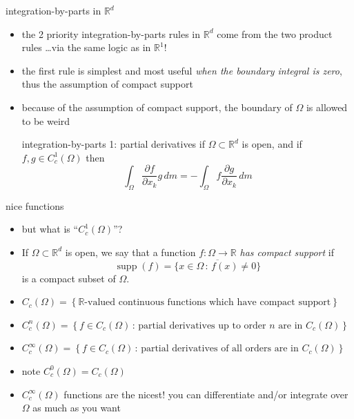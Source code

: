 \documentclass[10pt,
               svgnames,
               hyperref={colorlinks,
                         citecolor=DeepPink4,
                         linkcolor=FireBrick,
                         urlcolor=blue},
               usepdftitle=false]{beamer}
\newcommand{\RR}{\mathbb{R}}
\begin{document}
\begin{frame}{integration-by-parts in $\RR^d$}

\begin{itemize}
\item the \alert{2 priority integration-by-parts rules} in $\RR^d$ come from the two product rules \dots via the same logic as in $\RR^1$!
\item the first rule is simplest and most useful \emph{when the boundary integral is zero}, thus the assumption of compact support
\item because of the assumption of compact support, the boundary of $\Omega$ is allowed to be weird

\begin{block}{integration-by-parts 1: partial derivatives}
if $\Omega\subset\RR^d$ is open, and if $f,g\in C_c^1(\Omega)$ then
    $$\int_\Omega \frac{\partial f}{\partial x_k} g\,dm = -\int_\Omega f \frac{\partial g}{\partial x_k}\,dm$$
\end{block}
\end{itemize}
\end{frame}


\begin{frame}{nice functions}

\begin{itemize}
\item but what is ``$C_c^1(\Omega)$''?
\end{itemize}

\begin{definition}
\begin{itemize}
\item If $\Omega\subset\RR^d$ is open, we say that a function $f:\Omega\to\RR$ \emph{has compact support} if
	 $$\operatorname{supp}(f) = \overline{\{x\in\Omega\,:\,f(x)\ne 0\}}$$
is a compact subset of $\Omega$.
\item $C_c(\Omega) = \left\{\text{$\RR$-valued continuous functions which have compact support}\right\}$
\item $C_c^n(\Omega) = \left\{f\in C_c(\Omega)\,:\,\text{partial derivatives up to order $n$ are in } C_c(\Omega)\right\}$
\item $C_c^\infty(\Omega) = \left\{f\in C_c(\Omega)\,:\,\text{partial derivatives of all orders are in } C_c(\Omega)\right\}$
\end{itemize}
\end{definition}

\begin{itemize}
\item note $C_c^0(\Omega)=C_c(\Omega)$
\item \alert{$C_c^\infty(\Omega)$ functions are the nicest}!  you can differentiate and/or integrate over $\Omega$ as much as you want
\end{itemize}
\end{frame}
\end{document}
